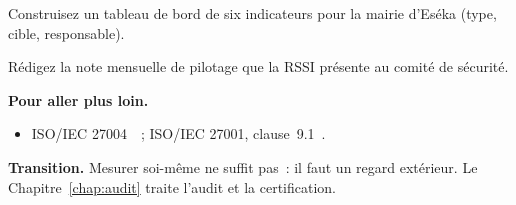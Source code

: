 \begin{boxexo}[title={\ding{45}\quad Exercice~18.9. Tableau de bord \niveauexpert}]
Construisez un tableau de bord de six indicateurs pour la mairie d'Eséka (type,
cible, responsable).
\end{boxexo}

\begin{boxexo}[title={\ding{45}\quad Exercice~18.10. Note de pilotage \niveauexpert}]
Rédigez la note mensuelle de pilotage que la RSSI présente au comité de
sécurité.
\end{boxexo}

\bigskip

\begin{boxinfo}
\textbf{Pour aller plus loin.}
\begin{itemize}
    \item ISO/IEC 27004~\cite{iso27004}~; ISO/IEC 27001, clause~9.1~\cite{iso27001}.
\end{itemize}
\end{boxinfo}

\begin{boxinfo}
\textbf{Transition.} Mesurer soi-même ne suffit pas~: il faut un regard
extérieur. Le Chapitre~\ref{chap:audit} traite l'audit et la certification.
\end{boxinfo}
